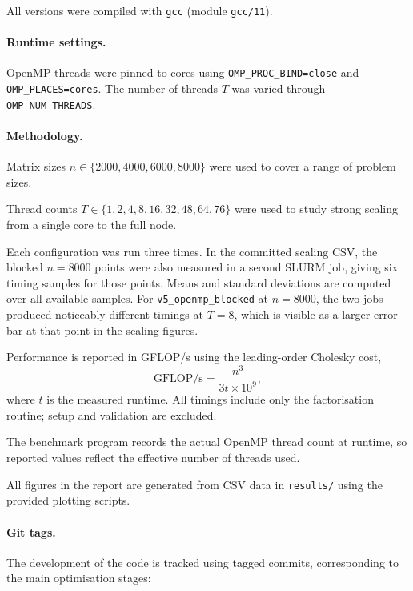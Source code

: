 \documentclass{article}
\begin{document}
All versions were compiled with \texttt{gcc} (module \texttt{gcc/11}).

\paragraph{Runtime settings.}
OpenMP threads were pinned to cores using
\texttt{OMP\_PROC\_BIND=close} and \texttt{OMP\_PLACES=cores}.
The number of threads $T$ was varied through
\texttt{OMP\_NUM\_THREADS}.

\paragraph{Methodology.}
Matrix sizes $n \in \{2000, 4000, 6000, 8000\}$ were used to cover a range
of problem sizes.

Thread counts $T \in \{1,2,4,8,16,32,48,64,76\}$ were used to study
strong scaling from a single core to the full node.

Each configuration was run three times. In the committed scaling CSV, the
blocked $n=8000$ points were also measured in a second SLURM job, giving six
timing samples for those points. Means and standard deviations are computed
over all available samples. For \texttt{v5\_openmp\_blocked} at $n=8000$,
the two jobs produced noticeably different timings at $T=8$, which is
visible as a larger error bar at that point in the scaling figures.

Performance is reported in GFLOP/s using the leading-order Cholesky cost,
\[
\mathrm{GFLOP/s} = \frac{n^3}{3t \times 10^9},
\]
where $t$ is the measured runtime.
All timings include only the factorisation routine; setup and validation
are excluded.

The benchmark program records the actual OpenMP thread count at runtime,
so reported values reflect the effective number of threads used.

All figures in the report are generated from CSV data in \texttt{results/}
using the provided plotting scripts.

\paragraph{Git tags.}
The development of the code is tracked using tagged commits, corresponding
to the main optimisation stages:
\end{document}
